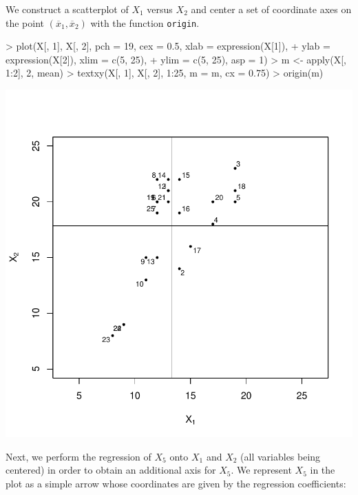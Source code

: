 \documentclass[a4paper]{article}
\begin{document}
We construct a scatterplot of $X_1$ versus $X_2$ and center a set of coordinate 
axes on the point $(\overline{x}_1,\overline{x}_2)$ with the function {\tt origin}.


\begin{Schunk}
\begin{Sinput}
> plot(X[, 1], X[, 2], pch = 19, cex = 0.5, xlab = expression(X[1]), 
+     ylab = expression(X[2]), xlim = c(5, 25), 
+     ylim = c(5, 25), asp = 1)
> m <- apply(X[, 1:2], 2, mean)
> textxy(X[, 1], X[, 2], 1:25, m = m, cx = 0.75)
> origin(m)
\end{Sinput}
\end{Schunk}
\includegraphics{CalibrationGuide-004}

Next, we perform the regression of $X_5$ onto $X_1$ and $X_2$ (all variables being centered) in order to 
obtain an additional axis for $X_5$. We represent $X_5$ in the plot as a simple 
arrow whose coordinates are given by the regression coefficients:
\end{document}
